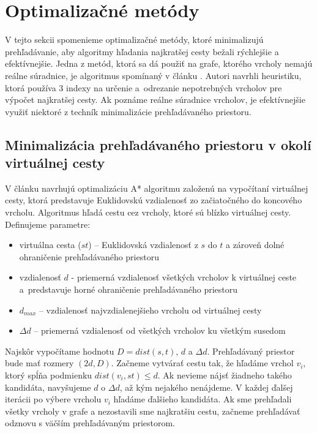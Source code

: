 \section{Optimalizačné metódy}
\label{sec:optimalization}
V tejto sekcii spomenieme optimalizačné metódy, ktoré minimalizujú prehľadávanie, aby algoritmy hľadania najkratšej cesty bežali rýchlejšie a efektívnejšie. Jedna z metód, ktorá sa dá použiť na grafe, ktorého vrcholy nemajú reálne súradnice, je algoritmus spomínaný v článku \cite{IBAS}. Autori navrhli heuristiku, ktorá používa 3 indexy na určenie a~odrezanie nepotrebných vrcholov pre výpočet najkratšej cesty. Ak poznáme reálne súradnice vrcholov, je efektívnejšie využiť niektoré z techník minimalizácie prehľadávaného priestoru.

\subsection{Minimalizácia prehľadávaného priestoru v okolí virtuálnej cesty}

V článku \cite{timedependent} navrhujú optimalizáciu A* algoritmu založenú na vypočítaní virtuálnej cesty, ktorá predstavuje Euklidovskú vzdialenosť zo začiatočného do koncového vrcholu. Algoritmus hľadá cestu cez vrcholy, ktoré sú blízko virtuálnej cesty. Definujeme parametre:
\begin{itemize}
\setlength\itemsep{-0.3em}
\item{virtuálna cesta ($st$) – Euklidovská vzdialenosť z $s$ do $t$} a zároveň dolné ohraničenie prehľadávaného priestoru
\item{vzdialenosť $d$ - priemerná vzdialenosť všetkých vrcholov k virtuálnej ceste a~predstavuje horné ohraničenie prehľadávaného priestoru}
\item{$d_{max}$ – vzdialenosť najvzdialenejšieho vrcholu od virtuálnej cesty}
\item{$\Delta d$ – priemerná vzdialenosť od všetkých vrcholov ku všetkým susedom}
\end{itemize}

Najskôr vypočítame hodnotu $D = dist(s,t)$, $d$ a $\Delta d$. Prehľadávaný priestor bude mať rozmery $(2d,D)$. Začneme vytvárať cestu tak, že hľadáme vrchol $v_i$, ktorý spĺňa podmienku $dist(v_i, st) \leq d$. Ak nevieme nájsť žiadneho takého kandidáta, navyšujeme $d$ o $\Delta d$, až kým nejakého nenájdeme. V každej ďalšej iterácii po výbere vrcholu $v_i$ hľadáme ďalšieho kandidáta. Ak sme prehľadali všetky vrcholy v grafe a nezostavili sme najkratšiu cestu, začneme prehľadávať odznovu s väčším prehľadávaným priestorom.

